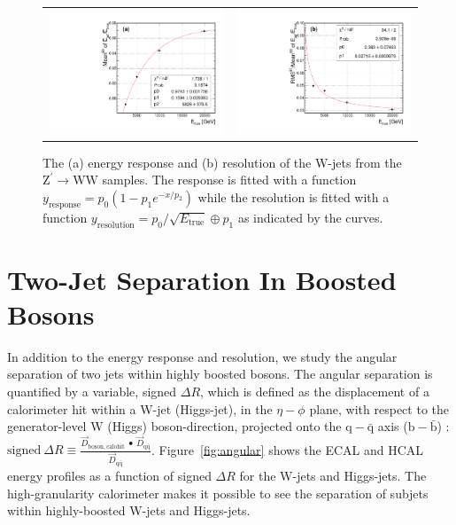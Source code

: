 \documentclass{PoS}
\begin{document}
\begin{figure}
\begin{center}
\begin{tabular}{cc}
\includegraphics[width=.35\textwidth]{figs/Mean90Fit.pdf} &
\includegraphics[width=.35\textwidth]{figs/RMS90Fit.pdf} \\
\end{tabular}
\end{center}
\caption{The (a) energy response and (b) resolution of the W-jets from the 
$\mathrm{Z}^{\prime}\rightarrow \mathrm{WW}$ samples. The response is fitted 
with a function $y_\mathrm{response} = p_0\left(1-p_1 e^{-x/p_2}\right)$ 
while the resolution is fitted with a function 
$y_\mathrm{resolution}=p_0/\sqrt{E_\mathrm{true}}\oplus p_1$ as indicated 
by the curves.
}
\label{fig:wjet}
\end{figure}

\section{Two-Jet Separation In Boosted Bosons \label{sec:angular}}
In addition to the energy response and resolution, we study the angular 
separation of two jets within highly boosted bosons. The angular separation 
is quantified by a variable, signed $\Delta R$, which is defined as the 
displacement of a calorimeter hit within a W-jet (Higgs-jet), in the 
$\eta-\phi$ plane, with respect to the generator-level W (Higgs) boson-direction, projected onto the $\mathrm{q}-\bar{\mathrm{q}}$ 
axis ($\mathrm{b}-\bar{\mathrm{b}}$) : \( \mathrm{signed}~\Delta R \equiv 
\frac{\overrightarrow{D}_{\mathrm{boson,calohit}}~\bullet~\overrightarrow{D}_{\mathrm{q}\bar{\mathrm{q}}}}{\overrightarrow{D}_{\mathrm{q}\bar{\mathrm{q}}}}\). 
Figure~\ref{fig:angular} shows the ECAL and HCAL energy profiles as a function 
of signed $\Delta R$ for the W-jets and Higgs-jets. The high-granularity 
calorimeter makes it possible to see the separation of subjets within 
highly-boosted W-jets and Higgs-jets.
\end{document}
